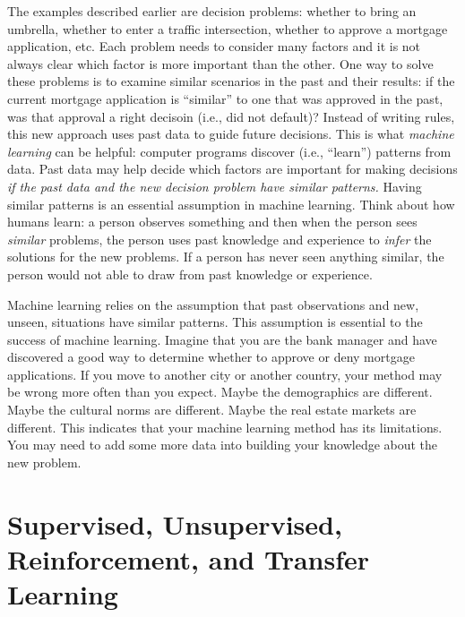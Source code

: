 
The examples described earlier are decision problems: whether to bring
an umbrella, whether to enter a traffic intersection, whether to
approve a mortgage application, etc. Each problem needs to consider
many factors and it is not always clear which factor is more important
than the other. One way to solve these problems is to examine similar
scenarios in the past and their results: if the current mortgage
application is ``similar'' to one that was approved in the past, was
that approval a right decisoin (i.e., did not default)?  Instead of
writing rules, this new approach uses past data to guide future
decisions.  This is what {\it machine learning} can be helpful:
computer programs discover (i.e., ``learn'') patterns from data.  Past
data may help decide which factors are important for making decisions
{\it if the past data and the new decision problem have similar
  patterns.}  Having similar patterns is an essential assumption in
machine learning.  Think about how humans learn: a person observes
something and then when the person sees {\it similar} problems, the
person uses past knowledge and experience to {\it infer} the solutions
for the new problems.  If a person has never seen anything similar,
the person would not able to draw from past knowledge or experience.

Machine learning relies on the assumption that past observations and
new, unseen, situations have similar patterns.  This assumption is
essential to the success of machine learning.  Imagine that you are
the bank manager and have discovered a good way to determine whether
to approve or deny mortgage applications.  If you move to another city
or another country, your method may be wrong more often than you
expect. Maybe the demographics are different. Maybe the cultural norms
are different.  Maybe the real estate markets are different.  This
indicates that your machine learning method has its limitations.  You
may need to add some more data into building your knowledge about the
new problem.




\section{Supervised, Unsupervised,  Reinforcement, and Transfer Learning}

